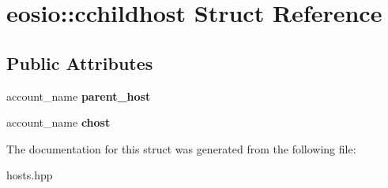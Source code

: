 \hypertarget{structeosio_1_1cchildhost}{}\section{eosio\+:\+:cchildhost Struct Reference}
\label{structeosio_1_1cchildhost}
\subsection*{Public Attributes}
\begin{DoxyCompactItemize}
\item 
\mbox{\label{structeosio_1_1cchildhost_acb5ab962479bfb85c8e1b094a1d30e62}} 
account\+\_\+name {\bfseries parent\+\_\+host}
\item 
\mbox{\label{structeosio_1_1cchildhost_a2eef1d46623ed965645d78882326f641}} 
account\+\_\+name {\bfseries chost}
\end{DoxyCompactItemize}


The documentation for this struct was generated from the following file\+:\begin{DoxyCompactItemize}
\item 
hosts.\+hpp\end{DoxyCompactItemize}
